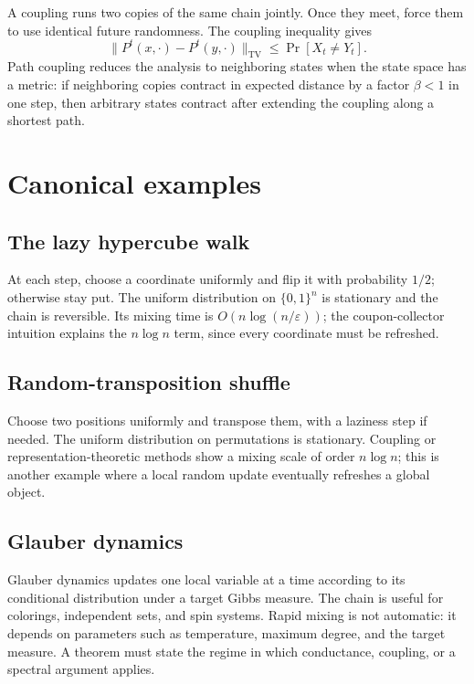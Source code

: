 A coupling runs two copies of the same chain jointly.  Once they meet, force
them to use identical future randomness.  The coupling inequality gives
\[
 \|P^t(x,\cdot)-P^t(y,\cdot)\|_{\mathrm{TV}}
 \leq\Pr[X_t\neq Y_t].
\]
Path coupling reduces the analysis to neighboring states when the state space
has a metric: if neighboring copies contract in expected distance by a
factor $\beta<1$ in one step, then arbitrary states contract after extending
the coupling along a shortest path.

\section{Canonical examples}

\subsection{The lazy hypercube walk}

At each step, choose a coordinate uniformly and flip it with probability
$1/2$; otherwise stay put.  The uniform distribution on $\{0,1\}^n$ is
stationary and the chain is reversible.  Its mixing time is
$O(n\log(n/\varepsilon))$; the coupon-collector intuition explains the
$n\log n$ term, since every coordinate must be refreshed.

\subsection{Random-transposition shuffle}

Choose two positions uniformly and transpose them, with a laziness step if
needed.  The uniform distribution on permutations is stationary.  Coupling
or representation-theoretic methods show a mixing scale of order
$n\log n$; this is another example where a local random update eventually
refreshes a global object.

\subsection{Glauber dynamics}

Glauber dynamics updates one local variable at a time according to its
conditional distribution under a target Gibbs measure.  The chain is useful
for colorings, independent sets, and spin systems.  Rapid mixing is not
automatic: it depends on parameters such as temperature, maximum degree, and
the target measure.  A theorem must state the regime in which conductance,
coupling, or a spectral argument applies.


